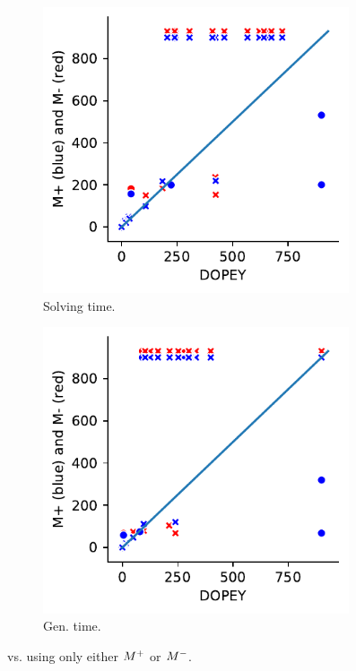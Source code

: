 \begin{figure}[t]
  \centering
  \begin{subfigure}{0.48\textwidth}
  \centering
    \includegraphics[width=0.99\textwidth]{figures/res-PN_vs_dpy_solving.pdf}
    \caption{Solving time.}
    \label{subfig:flame}
  \end{subfigure}
  \begin{subfigure}{0.48\textwidth}
  \centering
    \includegraphics[width=0.99\textwidth]{figures/res-PN_vs_dpy_ind_gen.pdf}
    \caption{Gen. time.}
    \label{subfig:dpy_vs_np_total_sub}
	\end{subfigure}
\caption{\dpy vs. using only either {\color{blue}$M^+$} or {\color{red}$M^-$}.}
\label{fig:dpy_vs_np}
\vspace{-0.6cm}
\end{figure}